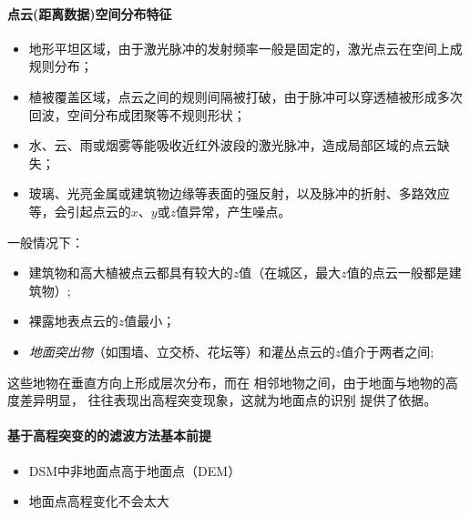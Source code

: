 \paragraph{点云(距离数据)空间分布特征}
\begin{itemize}
	\item 地形平坦区域，由于激光脉冲的发射频率一般是固定的，激光点云在空间上成规则分布；
	\item 植被覆盖区域，点云之间的规则间隔被打破，由于脉冲可以穿透植被形成多次回波，空间分布成团聚等不规则形状；
	\item 水、云、雨或烟雾等能吸收近红外波段的激光脉冲，造成局部区域的点云缺失；
	\item 玻璃、光亮金属或建筑物边缘等表面的强反射，以及脉冲的折射、多路效应等，会引起点云的$ x $、$ y $或$ z $值异常，产生噪点。
\end{itemize}
一般情况下：
\begin{itemize}
	\item 建筑物和高大植被点云都具有较大的$ z $值（在城区，最大$ z $值的点云一般都是建筑物）;
	\item 裸露地表点云的$ z $值最小；
	\item \textit{地面突出物}（如围墙、立交桥、花坛等）和灌丛点云的$ z $值介于两者之间;
\end{itemize}
这些地物在垂直方向上形成层次分布，而在
相邻地物之间，由于地面与地物的高度差异明显，
往往表现出高程突变现象，这就为地面点的识别
提供了依据。

\paragraph{基于高程突变的的滤波方法基本前提}
\begin{itemize}
	\item DSM中非地面点高于地面点（DEM）
	\item 地面点高程变化不会太大
\end{itemize}

